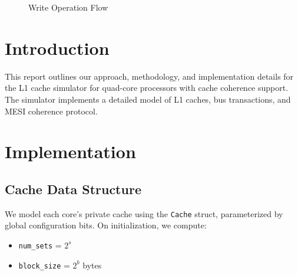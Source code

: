 \documentclass{article}
\begin{document}
\begin{figure}[H]
    \caption{Write Operation Flow}
    \label{fig:write_flow}
\end{figure}

\section{Introduction}
This report outlines our approach, methodology, and implementation details for the L1 cache simulator for quad-core processors with cache coherence support. The simulator implements a detailed model of L1 caches, bus transactions, and MESI coherence protocol.

\section{Implementation}

\subsection{Cache Data Structure}
We model each core's private cache using the \texttt{Cache} struct, parameterized by global configuration bits. On initialization, we compute:
\begin{itemize}
    \item \texttt{num\_sets} = $2^s$
    \item \texttt{block\_size} = $2^b$ bytes
\end{itemize}
\end{document}
